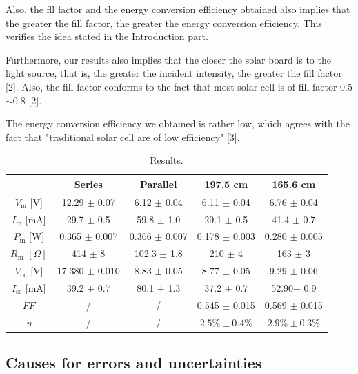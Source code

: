 \documentclass{article}
\begin{document}
{Also, the fll factor and the energy conversion efficiency obtained also implies that the greater the fill factor, the greater the energy conversion efficiency. This verifies the idea stated in the Introduction part.

Furthermore, our results also implies that the closer the solar board is to the light source, that is, the greater the incident intensity, the greater the fill factor [2]. Also, the fill factor conforms to the fact that most solar cell is of fill factor 0.5$\sim$0.8 [2].

The energy conversion efficiency we obtained is rather low, which agrees with the fact that "traditional solar cell are of low efficiency" [3].


\begin{table}[H]\centering
    \begin{tabular}{ccccc}
        \toprule
                                 & Series             & Parallel          & 197.5 cm           & 165.6 cm          \\
        \midrule
        $V_\text{m}$ [V]         & 12.29 $\pm$ 0.07   & 6.12 $\pm$ 0.04   & 6.11 $\pm$ 0.04    & 6.76 $\pm$ 0.04   \\
        $I_\text{m}$ [mA]        & 29.7 $\pm$ 0.5     & 59.8 $\pm$ 1.0    & 29.1 $\pm$ 0.5     & 41.4 $\pm$ 0.7    \\
        $P_\text{m}$ [W]         & 0.365 $\pm$ 0.007  & 0.366 $\pm$ 0.007 & 0.178 $\pm$ 0.003  & 0.280 $\pm$ 0.005 \\
        $R_\text{m}\,\,[\Omega]$ & 414 $\pm$ 8        & 102.3 $\pm$ 1.8   & 210 $\pm$ 4        & 163 $\pm$ 3       \\
        $V_\text{oc}$ [V]        & 17.380 $\pm$ 0.010 & 8.83 $\pm$ 0.05   & 8.77 $\pm$ 0.05    & 9.29 $\pm$ 0.06   \\
        $I_\text{sc}$ [mA]       & 39.2 $\pm$ 0.7     & 80.1 $\pm$ 1.3    & 37.2 $\pm$ 0.7     & 52.90$\pm$ 0.9    \\
        $FF$                     & /                  & /                 & 0.545 $\pm$ 0.015  & 0.569 $\pm$ 0.015 \\
        $\eta$                   & /                  & /                 & $2.5\% \pm 0.4 \%$ & $2.9\% \pm 0.3\%$ \\
        \bottomrule
    \end{tabular}
    \caption{Results.}\label{TableResult}
\end{table}

\subsection{Causes for errors and uncertainties}

}
\end{document}

